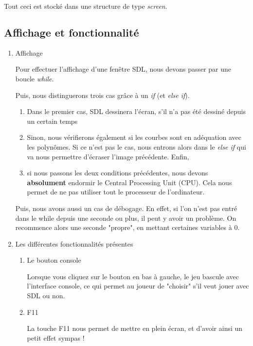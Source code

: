 \documentclass[letter]{article}
\begin{document}
Tout ceci est stocké dans une structure de type \emph{screen}.


\subsection{Affichage et fonctionnalité}
\label{sec:orge474a03}

\begin{enumerate}
\item Affichage
\label{sec:org5e1fdba}

Pour effectuer l'affichage d'une fenêtre SDL, nous devons passer par une boucle \emph{while}.

Puis, nous distinguerons trois cas grâce à un \emph{if} (et \emph{else if}).

\begin{enumerate}
\item Dans le premier cas, SDL dessinera l'écran, s'il n'a pas été dessiné depuis un certain temps
\item Sinon, nous vérifierons également si les courbes sont en adéquation avec les polynômes. Si ce n'est pas le cas, nous entrons alors dans le \emph{else if} qui va nous permettre d'écraser l'image précédente. Enfin,
\item si nous passons les deux conditions précédentes, nous devons \textbf{absolument} endormir le Central Processing Unit (CPU). Cela nous permet de ne pas utiliser tout le processeur de l'ordinateur.
\end{enumerate}

Puis, nous avons aussi un cas de débogage. En effet, si l'on n'est pas entré dans le while depuis une seconde ou plus, il peut y avoir un problème. On recommence alors une seconde "propre", en mettant certaines variables à 0.

\item Les différentes fonctionnalités présentes
\label{sec:orge4f058a}

\begin{enumerate}
\item Le bouton console
\label{sec:org8bcaa9d}

Lorsque vous cliquez sur le bouton en bas à gauche, le jeu bascule avec l'interface console, ce qui permet au joueur de "choisir" s'il veut jouer avec SDL ou non.

\item F11
\label{sec:org8085d9f}

La touche F11 nous permet de mettre en plein écran, et d'avoir ainsi un petit effet sympas !


\end{enumerate}
\end{enumerate}
\end{document}
